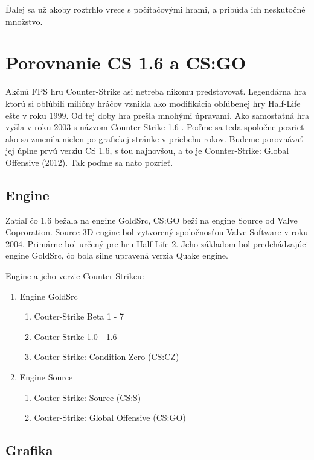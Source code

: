 \documentclass[10pt,oneside,slovak,a4paper]{article}
\begin{document}
Ďalej sa už akoby roztrhlo vrece s počítačovými hrami, a pribúda ich neskutočné množstvo.

\section{Porovnanie CS 1.6 a CS:GO} \label{porovnanie}

Akčnú FPS hru Counter-Strike asi netreba nikomu predstavovať. Legendárna hra ktorú si obľúbili milióny hráčov vznikla ako modifikácia obľúbenej hry Half-Life ešte v roku 1999. Od tej doby hra prešla mnohými úpravami. Ako samostatná hra vyšla v roku 2003 s názvom Counter-Strike 1.6 . Poďme sa teda spoločne pozrieť ako sa zmenila nielen po grafickej stránke v priebehu rokov. Budeme porovnávať jej úplne prvú verziu CS 1.6, s tou najnovšou, a to je Counter-Strike: Global Offensive (2012). Tak poďme sa nato pozrieť.


\subsection{Engine} \label{porovnanie:engine}
Zatiaľ čo 1.6 bežala na engine GoldSrc, CS:GO beží na engine Source od Valve Coproration. Source 3D engine bol vytvorený spoločnosťou Valve Software v roku 2004. Primárne bol určený pre hru Half-Life 2. Jeho základom bol predchádzajúci engine GoldSrc, čo bola silne upravená verzia Quake engine.

\pagebreak

Engine a jeho verzie Counter-Strikeu:
\begin{enumerate}
\item Engine GoldSrc
	\begin{enumerate}
	\item Couter-Strike Beta 1 - 7
	\item Couter-Strike 1.0 - 1.6
	\item Couter-Strike: Condition Zero (CS:CZ)
	\end{enumerate}
\item Engine Source
	\begin{enumerate}
	\item Couter-Strike: Source (CS:S)
	\item Couter-Strike: Global Offensive (CS:GO)
	\end{enumerate}
\end{enumerate}



\subsection{Grafika} \label{porovnanie:grafika}
\end{document}
